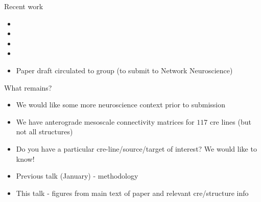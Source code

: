 \documentclass{beamer}
\begin{document}
\begin{frame}{Recent work}
\begin{itemize}
    \item {}
    \item {}
    \item {}
    \item {}
    \item Paper draft circulated to group (to submit to Network Neuroscience)
\end{itemize}
\end{frame}

\begin{frame}{What remains?}
\begin{itemize}
    \item We would like some more neuroscience context prior to submission
    \item We have anterograde mesoscale connectivity matrices for $117$ cre lines (but not all structures)
    \item Do you have a particular cre-line/source/target of interest? We would like to know!
    \item Previous talk (January) - methodology
    \item This talk - figures from main text of paper and relevant cre/structure info
\end{itemize}
\end{frame}
\end{document}
